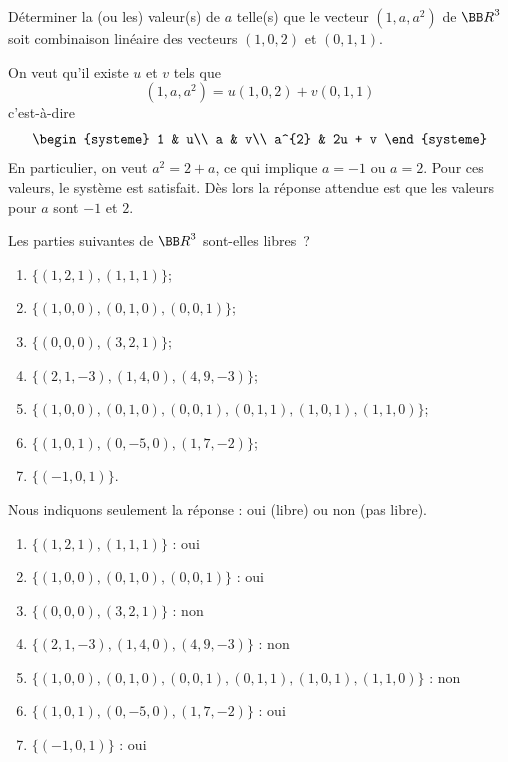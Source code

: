 \documentclass[12pt,french,oneside,a4paper]{memoir} %
\begin{document}
\begin{exo} %
Déterminer la (ou les) valeur(s) de $a$ telle(s) que le vecteur 
$(1,a,a^2)$ de ${\BB R}^3$ soit combinaison linéaire des vecteurs 
$(1,0,2)$ et $(0,1,1)$. 

\begin{correction}
  On veut qu'il existe $u$ et $v$ tels que
  \begin{equation*}
    (1,a,a^{2}) = u (1,0,2) + v (0,1,1)
  \end{equation*}
  c'est-à-dire
  \begin{equation*}
    \begin{systeme}
      1 & u\\
      a & v\\
      a^{2} & 2u + v
    \end{systeme}
  \end{equation*}
  En particulier, on veut $a^{2} = 2 + a$, ce qui implique $a = -1$ ou $a = 2$. Pour ces valeurs, le système est satisfait. Dès lors la réponse attendue est que les valeurs pour $a$ sont $-1$ et $2$.
\end{correction}
\end{exo}
\begin{exo} %
Les parties suivantes de ${\BB R}^3$ sont-elles libres~?
\begin{enumerate}
\item $\{(1,2,1),(1,1,1) \}$; 
\item $\{(1,0,0),(0,1,0),(0,0,1) \}$;
\item $\{(0,0,0),(3,2,1) \}$;
\item $\{(2,1,-3),(1,4,0),(4,9,-3) \}$;
\item $\{(1,0,0),(0,1,0),(0,0,1),(0,1,1),(1,0,1),(1,1,0) \}$;
\item $\{(1,0,1),(0,-5,0),(1,7,-2) \}$;
\item $\{(-1,0,1) \}$.
\end{enumerate}

\begin{correction}
Nous indiquons seulement la réponse : oui (libre) ou non (pas libre).
\begin{enumerate}
\item $\{(1,2,1),(1,1,1) \}$ : oui
\item $\{(1,0,0),(0,1,0),(0,0,1) \}$ : oui
\item $\{(0,0,0),(3,2,1) \}$ : non
\item $\{(2,1,-3),(1,4,0),(4,9,-3) \}$ : non
\item $\{(1,0,0),(0,1,0),(0,0,1),(0,1,1),(1,0,1),(1,1,0) \}$ : non
\item $\{(1,0,1),(0,-5,0),(1,7,-2) \}$ : oui
\item $\{(-1,0,1) \}$ : oui
\end{enumerate}
\end{correction}
\end{exo}
\end{document}
